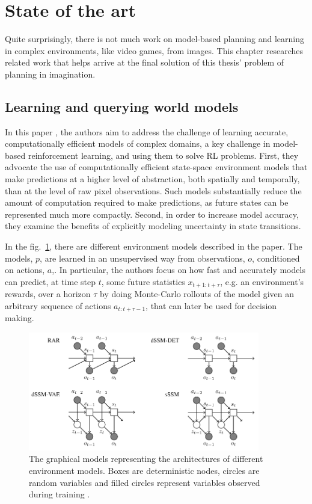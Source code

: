 \section{State of the art}

Quite surprisingly, there is not much work on model-based planning and learning in complex environments, like video games, from images. This chapter researches related work that helps arrive at the final solution of this thesis' problem of planning in imagination.

\subsection{Learning and querying world models}

In this paper \cite{Algo.FastGenerativeModels}, the authors aim to address the challenge of learning accurate, computationally efficient models of complex domains, a key challenge in model-based reinforcement learning, and using them to solve RL problems. First, they advocate the use of computationally efficient state-space environment models that make predictions at a higher level of abstraction, both spatially and temporally, than at the level of raw pixel observations. Such models substantially reduce the amount of computation required to make predictions, as future states can be represented much more compactly. Second, in order to increase model accuracy, they examine the benefits of explicitly modeling uncertainty in state transitions.

In the fig.~\ref{Fig.FastGenerativeModels}, there are different environment models described in the paper. The models, $p$, are learned in an unsupervised way from observations, $o$, conditioned on actions, $a$,. In particular, the authors focus on how fast and accurately models can predict, at time step $t$, some future statistics $x_{t+1:t+\tau}$, e.g. an environment's rewards, over a horizon $\tau$ by doing Monte-Carlo rollouts of the model given an arbitrary sequence of actions $a_{t:t+\tau−1}$, that can later be used for decision making.

\begin{figure}[H]
\includegraphics[width=0.9\textwidth,keepaspectratio]{figures/FastGenerativeModels.png}
\caption[Fast Generative Models]{The graphical models representing the architectures of different environment models. Boxes are deterministic nodes, circles are random variables and filled circles represent variables observed during training \protect\cite{Algo.FastGenerativeModels}.}
\label{Fig.FastGenerativeModels}
\end{figure}

